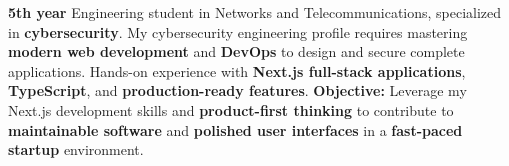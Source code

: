
\begin{cvparagraph}

    \textbf{5th year} Engineering student in Networks and Telecommunications, specialized in \textbf{cybersecurity}. My cybersecurity engineering profile requires mastering \textbf{modern web development} and \textbf{DevOps} to design and secure complete applications. Hands-on experience with \textbf{Next.js full-stack applications}, \textbf{TypeScript}, and \textbf{production-ready features}.
    \newline
    \textbf{Objective:} Leverage my Next.js development skills and \textbf{product-first thinking} to contribute to \textbf{maintainable software} and \textbf{polished user interfaces} in a \textbf{fast-paced startup} environment.

\end{cvparagraph}